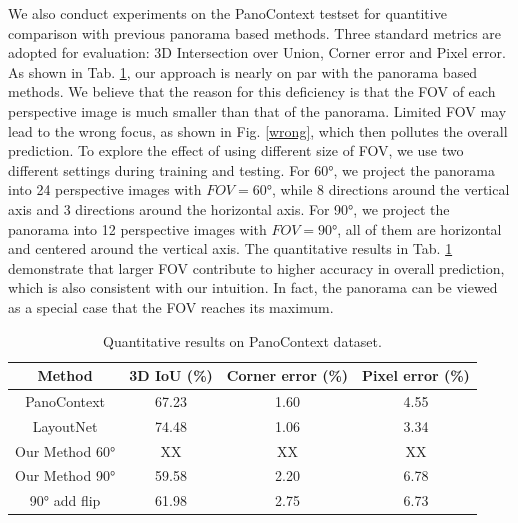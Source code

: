 We also conduct experiments on the PanoContext testset for quantitive comparison with previous panorama based methods. Three standard metrics are adopted for evaluation: 3D Intersection over Union, Corner error and Pixel error. As shown in Tab. \ref{tab:PC}, our approach is nearly on par with the panorama based methods. We believe that the reason for this deficiency is that the FOV of each perspective image is much smaller than that of the panorama. Limited FOV may lead to the wrong focus, as shown in Fig. \ref{wrong}, which then pollutes the overall prediction. To explore the effect of using different size of FOV, we use two different settings during training and testing. For \ang{60}, we project the panorama into 24 perspective images with $FOV=\ang{60}$, while 8 directions around the vertical axis and 3 directions around the horizontal axis. For \ang{90}, we project the panorama into 12 perspective images with $FOV=\ang{90}$, all of them are horizontal and centered around the vertical axis. The quantitative results in Tab. \ref{tab:PC} demonstrate that larger FOV contribute to higher accuracy in overall prediction, which is also consistent with our intuition. In fact, the panorama can be viewed as a special case that the FOV reaches its maximum.






\begin{table}
	\caption{Quantitative results on PanoContext dataset.}
	\label{tab:PC}
	\begin{tabular}{cccc}
		\toprule
		Method&3D IoU (\%)&Corner error (\%)&Pixel error (\%)\\
		\midrule
		PanoContext & 67.23 & 1.60 & 4.55\\
		LayoutNet & 74.48 & 1.06 & 3.34\\
		Our Method \ang{60} & XX & XX & XX\\	
		Our Method \ang{90} & 59.58 & 2.20 & 6.78\\	
		\ang{90} add flip & 61.98 & 2.75 & 6.73\\	
		\bottomrule
	\end{tabular}
\end{table}

